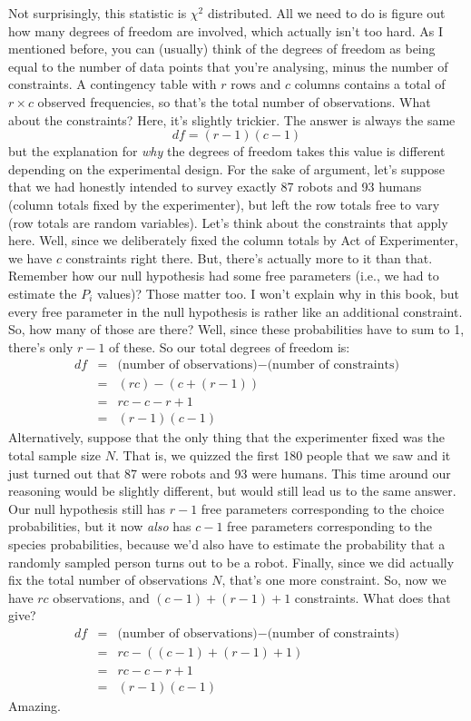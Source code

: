 Not surprisingly, this statistic is $\chi^2$ distributed. All we need to do is figure out how many degrees of freedom are involved, which actually isn't too hard. As I mentioned before, you can (usually) think of the degrees of freedom as being equal to the number of data points that you're analysing, minus the number of constraints. A contingency table with $r$ rows and $c$ columns contains a total of $r \times c$ observed frequencies, so that's the total number of observations. What about the constraints? Here, it's slightly trickier. The answer is always the same
$$
df = (r-1)(c-1)
$$
but the explanation for {\it why} the degrees of freedom takes this value is different depending on the experimental design. For the sake of argument, let's suppose that we had honestly intended to survey exactly 87 robots and 93 humans (column totals fixed by the experimenter), but left the row totals free to vary (row totals are random variables). Let's think about the constraints that apply here. Well, since we deliberately fixed the column totals by Act of Experimenter, we have $c$ constraints right there. But, there's actually more to it than that. Remember how our null hypothesis had some free parameters (i.e., we had to estimate the $P_i$ values)? Those matter too. I won't explain why in this book, but every free parameter in the null hypothesis is rather like an additional constraint. So, how many of those are there? Well, since these probabilities have to sum to 1, there's only $r-1$ of these. So our total degrees of freedom is:
$$
\begin{array}{rcl}
df &=& \mbox{(number of observations)} - \mbox{(number of constraints)} \\
&=& (rc) - (c + (r-1)) \\
&=& rc - c - r + 1 \\
&=& (r - 1)(c - 1)
\end{array}
$$
Alternatively, suppose that the only thing that the experimenter fixed was the total sample size $N$. That is, we quizzed the first 180 people that we saw and it just turned out that 87 were robots and 93 were humans. This time around our reasoning would be slightly different, but would still lead us to the same answer. Our null hypothesis still has $r-1$ free parameters corresponding to the choice probabilities, but it now {\it also} has $c-1$ free parameters corresponding to the species probabilities, because we'd also have to estimate the probability that a randomly sampled person turns out to be a robot. Finally, since we did actually fix the total number of observations $N$, that's one more constraint. So, now we have $rc$ observations, and $(c-1) + (r-1) + 1$ constraints. What does that give?
$$
\begin{array}{rcl}
df &=& \mbox{(number of observations)} - \mbox{(number of constraints)} \\
&=& rc - ( (c-1) + (r-1) + 1) \\
&=& rc - c - r + 1 \\
&=& (r - 1)(c - 1)
\end{array}
$$
Amazing. 


